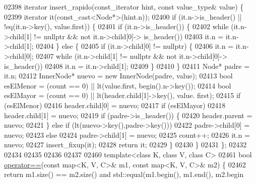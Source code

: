 \begin{DoxyCode}
02398     iterator insert\_rapido(const\_iterator hint, \textcolor{keyword}{const} value\_type& value) \{
02399         iterator it(const\_cast<Node*>(hint.n));
02400         \textcolor{keywordflow}{if} (it.n->is\_header() || !eq(it.n->key(), value.first)) \{
02401             \textcolor{keywordflow}{if} (it.n->is\_header()) \{
02402                 \textcolor{keywordflow}{while} (it.n->child[1] != \textcolor{keyword}{nullptr} && not it.n->child[0]->
      is\_header())
02403                     it.n = it.n->child[1];
02404             \} \textcolor{keywordflow}{else} \{
02405                 \textcolor{keywordflow}{if} (it.n->child[0] != \textcolor{keyword}{nullptr}) \{
02406                     it.n = it.n->child[0];
02407                     \textcolor{keywordflow}{while} (it.n->child[1] != \textcolor{keyword}{nullptr} && not it.n->child[0]->
      is\_header())
02408                         it.n = it.n->child[1];
02409                 \}
02410             \}
02411             Node* padre = it.n;
02412             InnerNode* nuevo = \textcolor{keyword}{new} InnerNode(padre, value);
02413             \textcolor{keywordtype}{bool} esElMenor = (count == 0) || lt(value.first, begin().n->key());
02414             \textcolor{keywordtype}{bool} esElMayor = (count == 0) || lt(header.child[1]->key(), value.
      first);
02415             \textcolor{keywordflow}{if} (esElMenor)
02416                 header.child[0] = nuevo;
02417             \textcolor{keywordflow}{if} (esElMayor)
02418                 header.child[1] = nuevo;
02419             \textcolor{keywordflow}{if} (padre->is\_header()) \{
02420                 header.parent = nuevo;
02421             \} \textcolor{keywordflow}{else} \textcolor{keywordflow}{if} (lt(nuevo->key(),padre->key()))
02422                 padre->child[0] = nuevo;
02423             \textcolor{keywordflow}{else}
02424                 padre->child[1] = nuevo;
02425             count++;
02426             it.n = nuevo;
02427             insert\_fixup(it);
02428             \textcolor{keywordflow}{return} it;
02429         \}
02430     \}
02431 \};
02432 
02434 
02435 
02436 
02437 
02460 \textcolor{keyword}{template}<\textcolor{keyword}{class} K, \textcolor{keyword}{class} V, \textcolor{keyword}{class} C>
02461 \textcolor{keywordtype}{bool} \hyperlink{classaed2_1_1map_abfc51b39670220e79037ac067006e933_abfc51b39670220e79037ac067006e933}{operator==}(\textcolor{keyword}{const} map<K, V, C>& m1, \textcolor{keyword}{const} map<K, V, C>& m2) \{
02462     \textcolor{keywordflow}{return} m1.size() == m2.size() and std::equal(m1.begin(), m1.end(), m2.begin

\end{DoxyCode}

